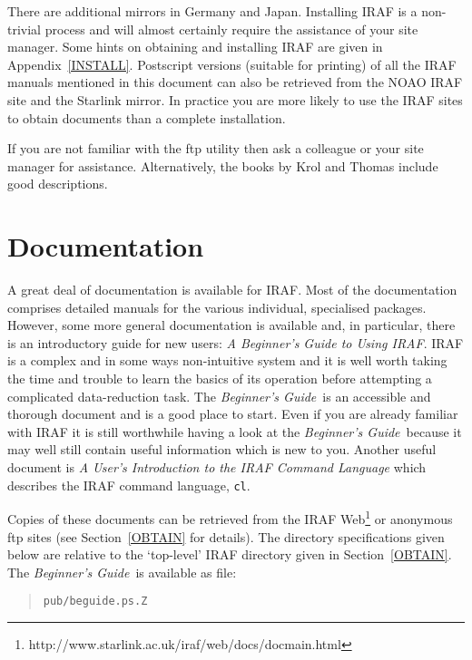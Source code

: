 \documentclass[twoside,11pt]{article}
\newcommand{\htmladdnormallinkfoot}[2]{#1\footnote{#2}}
\newcommand{\htmladdnormallink}[2]{#1}
\newcommand{\xlabel}[1]{}
\begin{document}
There are additional mirrors in Germany and Japan.
Installing IRAF is a non-trivial process and will almost certainly
require the assistance of your site manager.  Some hints on obtaining
and installing IRAF are given in Appendix~\ref{INSTALL}.  Postscript
versions (suitable for printing) of all the IRAF manuals mentioned in
this document can also be retrieved from the NOAO IRAF site and the
Starlink mirror.  In practice you are more likely to use the IRAF sites
to obtain documents than a complete installation.

If you are not familiar with the ftp utility then ask a colleague or
your site manager for assistance.  Alternatively, the books by
Krol\cite{KROL92} and Thomas\cite{THOMAS95} include good descriptions.


\section{\xlabel{DOC}\label{DOC}Documentation}

A great deal of \htmladdnormallink{documentation}
{http://iraf.noao.edu/iraf/web/docs/docmain.html}
is available for IRAF.  Most of the
documentation comprises detailed manuals for the various individual,
specialised packages.  However, some more general documentation is
available and, in particular, there is an introductory guide for new
users: {\it A Beginner's Guide to Using IRAF}\/\cite{BARNES93}.
IRAF is a complex and in some ways non-intuitive system and it is well
worth taking the time and trouble to learn the basics of its operation
before attempting a complicated data-reduction task.  The {\it
Beginner's Guide}\, is an accessible and thorough document and is a good
place to start.  Even if you are already familiar with IRAF it is still
worthwhile having a look at the {\it Beginner's Guide}\, because it may
well still contain useful information which is new to you.  Another
useful document is {\it A User's Introduction to the IRAF Command
Language}\/\cite{SHAMES86} which describes the IRAF command language,
{\tt cl}.

Copies of these documents can be retrieved from the IRAF
\htmladdnormallinkfoot{Web}
{http://www.starlink.ac.uk/iraf/web/docs/docmain.html}
or anonymous ftp sites (see Section~\ref{OBTAIN} for details).  The
directory specifications given below are relative to the `top-level' IRAF
directory given in Section~\ref{OBTAIN}.  The {\it Beginner's Guide}\, is
available as file:

\begin{quote}
{\tt pub/beguide.ps.Z}
\end{quote}
\end{document}
